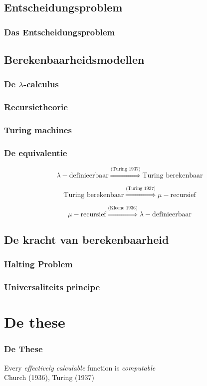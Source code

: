 \documentclass{beamer}
\begin{document}
\subsection{Entscheidungsproblem}
\begin{frame}
    \frametitle{Das Entscheidungsproblem}
\end{frame}

\subsection{Berekenbaarheidsmodellen}
\begin{frame}
    \frametitle{De $\lambda$-calculus}
\end{frame}

\begin{frame}
    \frametitle{Recursietheorie}
\end{frame}

\begin{frame}
    \frametitle{Turing machines}
\end{frame}

\begin{frame}
    \frametitle{De equivalentie}

    $$\lambda-\text{definieerbaar} \stackrel{\scriptscriptstyle \text{(Turing 1937)}}{\Longrightarrow} \text{Turing berekenbaar}$$

    $$\text{Turing berekenbaar} \stackrel{\scriptscriptstyle \text{(Turing 1937)}}{\Longrightarrow} \mu-\text{recursief} $$

    $$\mu-\text{recursief} \stackrel{\scriptscriptstyle \text{(Kleene 1936)}}{\Longrightarrow} \lambda-\text{definieerbaar} $$
\end{frame}

\subsection{De kracht van berekenbaarheid}
\begin{frame}
    \frametitle{Halting Problem}
\end{frame}

\begin{frame}
    \frametitle{Universaliteits principe}
\end{frame}

\section{De these}
\begin{frame}
    \frametitle{De These}
    \begin{center}
        {\Large
            Every \emph{effectively calculable} function is \emph{computable}
        }
        \\
        \bigskip
        \bigskip
        Church (1936), Turing (1937)
    \end{center}
\end{frame}
\end{document}
